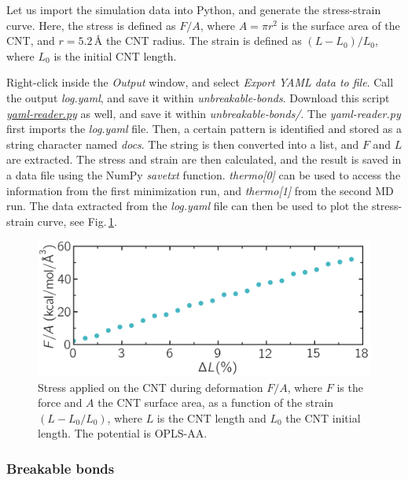 \documentclass[9pt,tutorial]{livecoms}
\newcommand{\filepath}{https://raw.githubusercontent.com/lammpstutorials/lammpstutorials-article/main/files/}
\begin{document}
Let us import the simulation data into Python, and generate the stress-strain curve.
Here, the stress is defined as $F/A$, where $A = \pi r^2$ is the surface area of the
CNT, and $r=5.2$\,\AA{} the CNT radius. The strain is defined as $(L-L_0)/L_0$,
where $L_0$ is the initial CNT length.

Right-click inside the \textit{Output} window, and select
\textit{Export YAML data to file}. Call the output \textit{log.yaml}, and save
it within \textit{unbreakable-bonds}. Download this script
\href{\filepath tutorial2/unbreakable-bonds/yaml-reader.py}{\textit{yaml-reader.py}} as well, and save it
within \textit{unbreakable-bonds/}. The \textit{yaml-reader.py} first imports
the \textit{log.yaml} file. Then, a certain pattern is
identified and stored as a string character named \textit{docs}. The string is
then converted into a list, and $F$ and $L$ are extracted. The stress and strain
are then calculated, and the result is saved in a data file using the
NumPy \textit{savetxt} function. \textit{thermo[0]} can be used to access the
information from the first minimization run, and \textit{thermo[1]} from
the second MD run. The data extracted from the \textit{log.yaml} file can
then be used to plot the stress-strain curve, see
Fig.\,\ref{fig:CNT-stress-strain-unbreakable}.

\begin{figure}
\centering
\includegraphics[width=\linewidth]{CNT-stress-strain-unbreakable}
\caption{Stress applied on the CNT during deformation $F/A$, where $F$ is the force
and $A$ the CNT surface area, as a function of the strain $(L-L_0/L_0)$, where
$L$ is the CNT length and $L_0$ the CNT initial length. The potential is OPLS-AA.}
\label{fig:CNT-stress-strain-unbreakable}
\end{figure}

\subsubsection{Breakable bonds}
\end{document}
